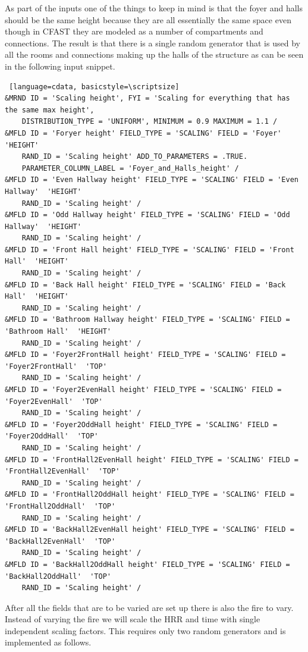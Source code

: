 \documentclass[12pt,twoside]{book}
\begin{document}
As part of the inputs one of the things to keep in mind is that the foyer and halls should be the same height because they are all essentially the same space even though in CFAST they are modeled as a number of compartments and connections. The result is that there is a single random generator that is used by all the rooms and connections making up the halls of the structure as can be seen in the following input snippet.


\vspace{\baselineskip}
\begin{lstlisting} [language=cdata, basicstyle=\scriptsize]
&MRND ID = 'Scaling height', FYI = 'Scaling for everything that has the same max height',
	DISTRIBUTION_TYPE = 'UNIFORM', MINIMUM = 0.9 MAXIMUM = 1.1 /
&MFLD ID = 'Foryer height' FIELD_TYPE = 'SCALING' FIELD = 'Foyer'  'HEIGHT'
    RAND_ID = 'Scaling height' ADD_TO_PARAMETERS = .TRUE.
    PARAMETER_COLUMN_LABEL = 'Foyer_and_Halls_height' /
&MFLD ID = 'Even Hallway height' FIELD_TYPE = 'SCALING' FIELD = 'Even Hallway'  'HEIGHT'
	RAND_ID = 'Scaling height' /
&MFLD ID = 'Odd Hallway height' FIELD_TYPE = 'SCALING' FIELD = 'Odd Hallway'  'HEIGHT'
	RAND_ID = 'Scaling height' /
&MFLD ID = 'Front Hall height' FIELD_TYPE = 'SCALING' FIELD = 'Front Hall'  'HEIGHT'
	RAND_ID = 'Scaling height' /
&MFLD ID = 'Back Hall height' FIELD_TYPE = 'SCALING' FIELD = 'Back Hall'  'HEIGHT'
	RAND_ID = 'Scaling height' /
&MFLD ID = 'Bathroom Hallway height' FIELD_TYPE = 'SCALING' FIELD = 'Bathroom Hall'  'HEIGHT'
	RAND_ID = 'Scaling height' /
&MFLD ID = 'Foyer2FrontHall height' FIELD_TYPE = 'SCALING' FIELD = 'Foyer2FrontHall'  'TOP'
	RAND_ID = 'Scaling height' /
&MFLD ID = 'Foyer2EvenHall height' FIELD_TYPE = 'SCALING' FIELD = 'Foyer2EvenHall'  'TOP'
	RAND_ID = 'Scaling height' /
&MFLD ID = 'Foyer2OddHall height' FIELD_TYPE = 'SCALING' FIELD = 'Foyer2OddHall'  'TOP'
	RAND_ID = 'Scaling height' /
&MFLD ID = 'FrontHall2EvenHall height' FIELD_TYPE = 'SCALING' FIELD = 'FrontHall2EvenHall'  'TOP'
	RAND_ID = 'Scaling height' /
&MFLD ID = 'FrontHall2OddHall height' FIELD_TYPE = 'SCALING' FIELD = 'FrontHall2OddHall'  'TOP'
	RAND_ID = 'Scaling height' /
&MFLD ID = 'BackHall2EvenHall height' FIELD_TYPE = 'SCALING' FIELD = 'BackHall2EvenHall'  'TOP'
	RAND_ID = 'Scaling height' /
&MFLD ID = 'BackHall2OddHall height' FIELD_TYPE = 'SCALING' FIELD = 'BackHall2OddHall'  'TOP'
	RAND_ID = 'Scaling height' /
\end{lstlisting}

After all the fields that are to be varied are set up there is also the fire to vary. Instead of varying the fire we will scale the HRR and time with single independent scaling factors. This requires only two random generators and is implemented as follows.
\end{document}
